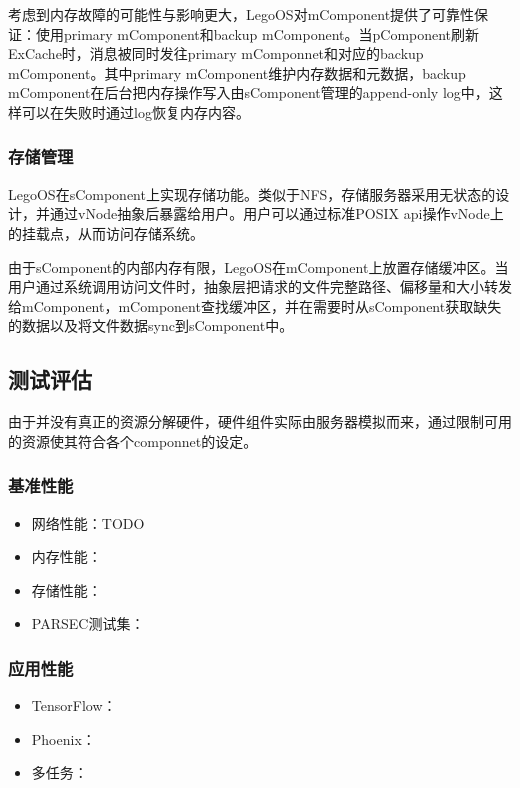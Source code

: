考虑到内存故障的可能性与影响更大，LegoOS对mComponent提供了可靠性保证：使用primary mComponent和backup mComponent。当pComponent刷新ExCache时，消息被同时发往primary mComponnet和对应的backup mComponent。其中primary mComponent维护内存数据和元数据，backup mComponent在后台把内存操作写入由sComponent管理的append-only log中，这样可以在失败时通过log恢复内存内容。

\subsubsection{存储管理}

LegoOS在sComponent上实现存储功能。类似于NFS，存储服务器采用无状态的设计，并通过vNode抽象后暴露给用户。用户可以通过标准POSIX api操作vNode上的挂载点，从而访问存储系统。

由于sComponent的内部内存有限，LegoOS在mComponent上放置存储缓冲区。当用户通过系统调用访问文件时，抽象层把请求的文件完整路径、偏移量和大小转发给mComponent，mComponent查找缓冲区，并在需要时从sComponent获取缺失的数据以及将文件数据sync到sComponent中。

\subsection{测试评估}

由于并没有真正的资源分解硬件，硬件组件实际由服务器模拟而来，通过限制可用的资源使其符合各个componnet的设定。

\subsubsection{基准性能}

\begin{itemize}
\item 网络性能：TODO
\item 内存性能：
\item 存储性能：
\item PARSEC测试集：
\end{itemize}

\subsubsection{应用性能}

\begin{itemize}
\item TensorFlow：
\item Phoenix：
\item 多任务：
\end{itemize}

